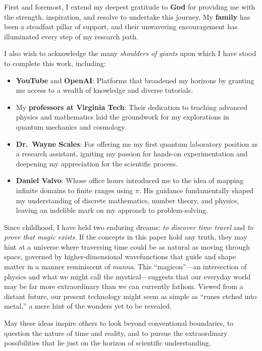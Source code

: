 \documentclass{article}
\begin{document}
First and foremost, I extend my deepest gratitude to \textbf{God} for 
providing me with the strength, inspiration, and resolve to undertake 
this journey. My \textbf{family} has been a steadfast pillar of support, 
and their unwavering encouragement has illuminated every step of my 
research path.

I also wish to acknowledge the many \emph{shoulders of giants} upon which 
I have stood to complete this work, including:
\begin{itemize}
  \item  \textbf{YouTube} and \textbf{OpenAI}: Platforms that broadened my 
        horizons by granting me access to a wealth of knowledge and diverse 
        tutorials.
  \item My \textbf{professors at Virginia Tech}: Their dedication to teaching 
        advanced physics and mathematics laid the groundwork for my explorations 
        in quantum mechanics and cosmology.
  \item \textbf{Dr.\ Wayne Scales}: For offering me my first quantum laboratory 
        position as a research assistant, igniting my passion for hands-on 
        experimentation and deepening my appreciation for the scientific process.
  \item \textbf{Daniel Valvo}: Whose office hours introduced me to the idea of 
        mapping infinite domains to finite ranges using $\pi$. His guidance 
        fundamentally shaped my understanding of discrete mathematics, 
        number theory, and physics, leaving an indelible mark on my approach 
        to problem-solving.
\end{itemize}

Since childhood, I have held two enduring dreams: \textit{to discover time travel} 
and \textit{to prove that magic exists}. If the concepts in this paper hold any 
truth, they may hint at a universe where traversing time could be as natural as 
moving through space, governed by higher-dimensional wavefunctions that guide 
and shape matter in a manner reminiscent of \emph{manna}. This ``magicon''---an 
intersection of physics and what we might call the mystical---suggests that 
our everyday world may be far more extraordinary than we can currently fathom. 
Viewed from a distant future, our present technology might seem as simple as 
``runes etched into metal,'' a mere hint of the wonders yet to be revealed.

May these ideas inspire others to look beyond conventional boundaries, to 
question the nature of time and reality, and to pursue the extraordinary 
possibilities that lie just on the horizon of scientific understanding.
\end{document}

